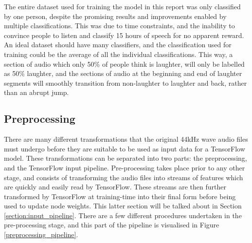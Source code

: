 \documentclass[a4paper,11pt,notitlepage]{article}
\begin{document}
The entire dataset used for training the model in this report was only classified by one person, despite the promising results and improvements enabled by multiple classifications. This was due to time constraints, and the inability to convince people to listen and classify 15 hours of speech for no apparent reward. An ideal dataset should have many classifiers, and the classification used for training could be the average of all the individual classifications. This way, a section of audio which only 50\% of people think is laughter, will only be labelled as 50\% laughter, and the sections of audio at the beginning and end of laughter segments will smoothly transition from non-laughter to laughter and back, rather than an abrupt jump.

\subsection{Preprocessing}


There are many different transformations that the original 44kHz wave audio files must undergo before they are suitable to be used as input data for a TensorFlow model. These transformations can be separated into two parts: the preprocessing, and the TensorFlow input pipeline. Pre-processing takes place prior to any other stage, and consists of transforming the audio files into streams of features which are quickly and easily read by TensorFlow. These streams are then further transformed by TensorFlow at training-time into their final form before being used to update node weights. This latter section will be talked about in Section \ref{section:input_pipeline}. There are a few different procedures undertaken in the pre-processing stage, and this part of the pipeline is visualised in Figure \ref{preprocessing_pipeline}.
\end{document}
